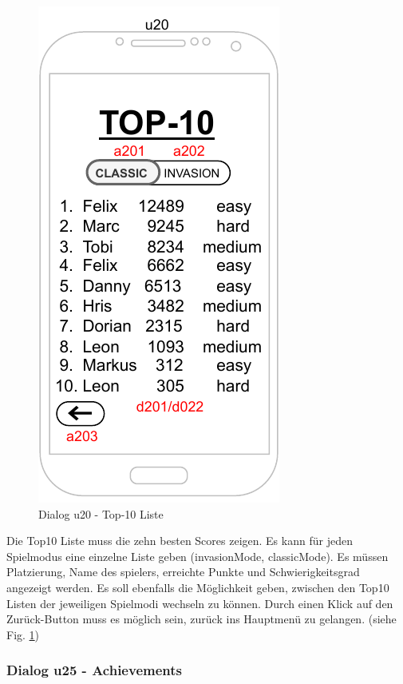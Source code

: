 \begin{figure}[h!]
    \begin{center}
    \includegraphics[scale=1.4]{diagramme/pdf/Mockup-u20.pdf}
    \end{center}
    \caption{Dialog u20 - Top-10 Liste}\label{fig:dia:u20}
\end{figure}

Die \gls{Top10} Liste muss die zehn besten Scores zeigen. Es kann für jeden Spielmodus eine einzelne Liste geben (\gls{invasionMode}, \gls{classicMode}). 
Es müssen Platzierung, Name des \glspl{spieler}, erreichte Punkte und Schwierigkeitsgrad angezeigt werden. Es soll ebenfalls die Möglichkeit geben, zwischen den \gls{Top10} Listen der jeweiligen Spielmodi wechseln zu können.
Durch einen Klick auf den Zurück-Button muss es möglich sein, zurück ins Hauptmenü zu gelangen.
(siehe Fig. \ref{fig:dia:u20})
\clearpage

\subsubsection{Dialog u25 - Achievements}\label{dialog:Achievements}

